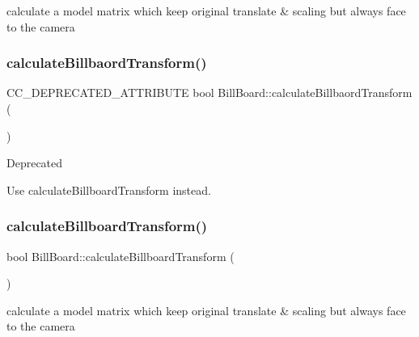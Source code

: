 calculate a model matrix which keep original translate \& scaling but always face to the camera \mbox{\label{classBillBoard_a8ae4248e8b3700d1c40fbc7b212ca95d}} 
\subsubsection{\texorpdfstring{calculate\+Billbaord\+Transform()}{calculateBillbaordTransform()}\hspace{0.1cm}{\footnotesize\ttfamily [2/2]}}
{\footnotesize\ttfamily C\+C\+\_\+\+D\+E\+P\+R\+E\+C\+A\+T\+E\+D\+\_\+\+A\+T\+T\+R\+I\+B\+U\+TE bool Bill\+Board\+::calculate\+Billbaord\+Transform (\begin{DoxyParamCaption}{ }\end{DoxyParamCaption})\hspace{0.3cm}{\ttfamily [protected]}}

\begin{DoxyRefDesc}{Deprecated}
\item[\hyperlink{deprecated__deprecated000279}{Deprecated}]Use calculate\+Billboard\+Transform instead. \end{DoxyRefDesc}
\mbox{\label{classBillBoard_ad38011949e599e214f162a245b929c9c}} 
\subsubsection{\texorpdfstring{calculate\+Billboard\+Transform()}{calculateBillboardTransform()}}
{\footnotesize\ttfamily bool Bill\+Board\+::calculate\+Billboard\+Transform (\begin{DoxyParamCaption}{ }\end{DoxyParamCaption})\hspace{0.3cm}{\ttfamily [protected]}}

calculate a model matrix which keep original translate \& scaling but always face to the camera \mbox{\label{classBillBoard_ae87c60e6d7278f55d836adb09281a286}} 

